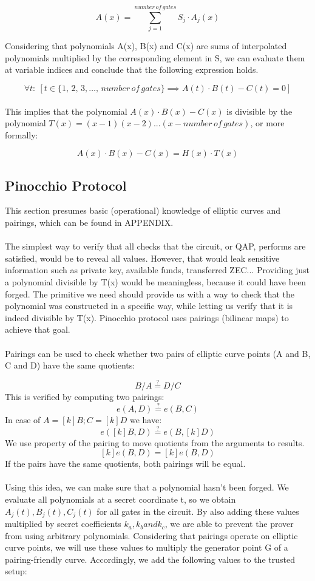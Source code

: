 $$ A(x) = \sum_{j = 1}^{number\,of\,gates} S_j \cdot A_j(x) $$

Considering that polynomials A(x), B(x) and C(x) are sums of interpolated polynomials multiplied by the corresponding element in S, we can evaluate them at variable indices and conclude that the following expression holds.

$$\forall t:\: [t \in \{1,\,2,\,3, \dots ,\,number\,of\,gates\} \implies A(t) \cdot B(t) - C(t) = 0]$$
\\
This implies that the polynomial $A(x) \cdot B(x) - C(x)$ is divisible by the polynomial $T(x) = (x-1)(x-2)...(x-number\,of\,gates)$, or more formally:

$$ A(x) \cdot B(x) - C(x) = H(x) \cdot T(x) $$

\subsection{Pinocchio Protocol}

This section presumes basic (operational) knowledge of elliptic curves and pairings, which can be found in APPENDIX.\\
\\
The simplest way to verify that all checks that the circuit, or QAP, performs are satisfied, would be to reveal all values. However, that would leak sensitive information such as private key, available funds, transferred ZEC... Providing just a polynomial divisible by T(x) would be meaningless, because it could have been forged. The primitive we need should provide us with a way to check that the polynomial was constructed in a specific way, while letting us verify that it is indeed divisible by T(x). Pinocchio protocol uses  pairings (bilinear maps) to achieve that goal.\\
\\
Pairings can be used to check whether two pairs of elliptic curve points (A and B, C and D) have the same quotients:

$$ B / A \stackrel{?}{=} D / C $$
This is verified by computing two pairings:
$$ e(A, D) \stackrel{?}{=} e(B, C) $$
In case of $A = [k]B; C = [k]D$ we have:
$$ e([k]B, D) \stackrel{?}{=} e(B, [k]D)$$
We use property of the pairing to move quotients from the arguments to results.
$$ [k]e(B, D) = [k]e(B, D) $$
If the pairs have the same quotients, both pairings will be equal.\\
\\
Using this idea, we can make sure that a polynomial hasn't been forged. We evaluate all polynomials at a secret coordinate t, so we obtain $A_j(t), B_j(t), C_j(t)$ for all gates in the circuit. By also adding these values multiplied by secret coefficients $k_a, k_b and k_c$, we are able to prevent the prover from using arbitrary polynomials. Considering that pairings operate on elliptic curve points, we will use these values to multiply the generator point G of a pairing-friendly curve. Accordingly, we add the following values to the trusted setup:

